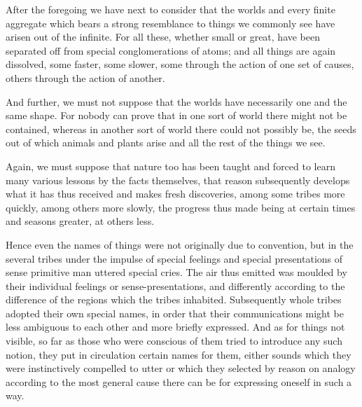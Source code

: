 \documentclass{stex}
\begin{document}
After the foregoing we have next to consider that the worlds and every finite aggregate which bears a strong resemblance to things we commonly see have arisen out of the infinite.
For all these, whether small or great, have been separated off from special conglomerations of atoms; and all things are again dissolved, some faster, some slower, some through the action of one set of causes, others through the action of another.

And further, we must not suppose that the worlds have necessarily one and the same shape.
For nobody can prove that in one sort of world there might not be contained, whereas in another sort of world there could not possibly be, the seeds out of which animals and plants arise and all the rest of the things we see.

Again, we must suppose that nature too has been taught and forced to learn many various lessons by the facts themselves, that reason subsequently develops what it has thus received and makes fresh discoveries, among some tribes more quickly, among others more slowly, the progress thus made being at certain times and seasons greater, at others less.

Hence even the names of things were not originally due to convention, but in the several tribes under the impulse of special feelings and special presentations of sense primitive man uttered special cries.
The air thus emitted was moulded by their individual feelings or sense-presentations, and differently according to the difference of the regions which the tribes inhabited.
Subsequently whole tribes adopted their own special names, in order that their communications might be less ambiguous to each other and more briefly expressed.
And as for things not visible, so far as those who were conscious of them tried to introduce any such notion, they put in circulation certain names for them, either sounds which they were instinctively compelled to utter or which they selected by reason on analogy according to the most general cause there can be for expressing oneself in such a way.
\end{document}
